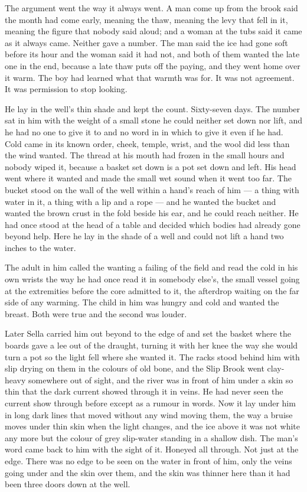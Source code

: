 The argument went the way it always went. A man come up from the brook said the month had come early, meaning the thaw, meaning the levy that fell in it, meaning the figure that nobody said aloud; and a woman at the tubs said it came as it always came. Neither gave a number. The man said the ice had gone soft before its hour and the woman said it had not, and both of them wanted the late one in the end, because a late thaw puts off the paying, and they went home over it warm. The boy had learned what that warmth was for. It was not agreement. It was permission to stop looking.

He lay in the well's thin shade and kept the count. Sixty-seven days. The number sat in him with the weight of a small stone he could neither set down nor lift, and he had no one to give it to and no word in  in which to give it even if he had. Cold came in its known order, cheek, temple, wrist, and the wool did less than the wind wanted. The thread at his mouth had frozen in the small hours and nobody wiped it, because a basket set down is a pot set down and left. His head went where it wanted and made the small wet sound when it went too far. The bucket stood on the wall of the well within a hand's reach of him --- a thing with water in it, a thing with a lip and a rope --- and he wanted the bucket and wanted the brown crust in the fold beside his ear, and he could reach neither. He had once stood at the head of a table and decided which bodies had already gone beyond help. Here he lay in the shade of a well and could not lift a hand two inches to the water.

The adult in him called the wanting a failing of the field and read the cold in his own wrists the way he had once read it in somebody else's, the small vessel going at the extremities before the core admitted to it, the afterdrop waiting on the far side of any warming. The child in him was hungry and cold and wanted the breast. Both were true and the second was louder.

\scenebreak

Later Sella carried him out beyond  to the edge of  and set the basket where the boards gave a lee out of the draught, turning it with her knee the way she would turn a pot so the light fell where she wanted it. The racks stood behind him with slip drying on them in the colours of old bone, and the Slip Brook went clay-heavy somewhere out of sight, and the river was in front of him under a skin so thin that the dark current showed through it in veins. He had never seen the current show through before except as a rumour in words. Now it lay under him in long dark lines that moved without any wind moving them, the way a bruise moves under thin skin when the light changes, and the ice above it was not white any more but the colour of grey slip-water standing in a shallow dish. The man's word came back to him with the sight of it. Honeyed all through. Not just at the edge. There was no edge to be seen on the water in front of him, only the veins going under and the skin over them, and the skin was thinner here than it had been three doors down at the well.

